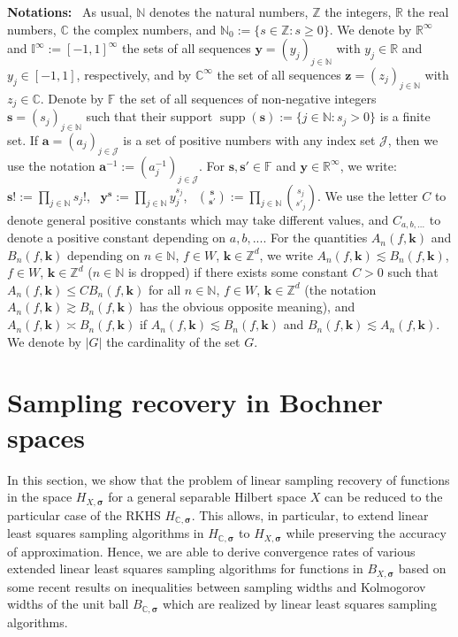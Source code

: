 \documentclass[11pt]{article}
\numberwithin{equation}{section}
\theoremstyle{definition}
\theoremstyle{remark}
\newcommand{\ba}{{\boldsymbol{a}}}
\newcommand{\bk}{{\boldsymbol{k}}}
\newcommand{\bs}{{\boldsymbol{s}}}
\newcommand{\by}{{\boldsymbol{y}}}
\newcommand{\bz}{{\boldsymbol{z}}}
\newcommand{\bsigma}{{\boldsymbol{\sigma}}}
\def\ZZd{{\mathbb Z}^d}
\def\ZZ{{\mathbb Z}}
\def\RR{{\mathbb R}}
\def\NN{{\mathbb N}}
\def\CC{{\mathbb C}}
\def\CC{{\mathbb C}}
\def\NN{{\mathbb N}}
\def\RR{{\mathbb R}}
\def\FF{{\mathcal F}}
\def\ZZd{{\mathbb Z}^d}
\def\IIi{{\mathbb I}^\infty}
\def\CCi{{\mathbb C}^\infty}
\def\RRi{{\mathbb R}^\infty}
\def\FF{{\mathcal F}}
\def\Jj{{\mathcal J}}
\def\CC{{\mathbb C}}
\def\ZZ{{\mathbb Z}}
\def\NN{{\mathbb N}}
\def\FF{{\mathbb F}}
\def\supp{\operatorname{supp}}
\begin{document}
\medskip
\noindent
{\bf Notations:} \ As usual, $\NN$ denotes the natural numbers, $\ZZ$ the integers, $\RR$ the real numbers, $\CC$ the complex numbers, and 
$ \NN_0:= \{s \in \ZZ: s \ge 0 \}$.
We denote by $\RR^\infty$ and $\IIi:=[-1,1]^\infty$ the
sets of all sequences $\by = (y_j)_{j\in \NN}$ with $y_j\in \RR$ and $y_j\in [-1,1]$, respectively, and by $\CCi$ the
set of all sequences $\bz = (z_j)_{j\in \NN}$ with $z_j\in \CC$.
 Denote by $\FF$ the set of all sequences of non-negative integers $\bs=(s_j)_{j \in \NN}$ such that their support $\supp (\bs):= \{j \in \NN: s_j >0\}$ is a finite set. 
If $\ba= (a_j)_{j \in \Jj}$ is a set of positive numbers with any index set $\Jj$, then we use the notation 
$\ba^{-1}:= (a_j^{-1})_{j \in \Jj}$.
For $\bs, \bs' \in \FF$ and $\by \in \RRi$, we write: 
$\bs!:= \prod_{j \in \NN}s_j!$, \ $\by^\bs:= \prod_{j \in \NN}y_j^{s_j}$, \
$\binom{\bs}{\bs'}:= \prod_{j \in \NN}\binom{s_j}{s'_j}$.
We use the letter $C$ to denote general 
positive constants which may take different values, and $C_{a,b,...}$ to denote a positive constant depending on $a,b,...$.
 For the quantities $A_n(f,\bk)$ and $B_n(f,\bk)$ depending on 
 $n \in \NN$, $f \in W$, $\bk \in \ZZd$, 
 we write $A_n(f,\bk) \lesssim B_n(f,\bk)$, $f \in W$, $\bk \in \ZZd$ ($n \in \NN$ is dropped)
 if there exists some constant $C >0$ such that 
 $A_n(f,\bk) \le CB_n(f,\bk)$ for all $n \in \NN$, $f \in W$, $\bk \in \ZZd$ (the notation $A_n(f,\bk) \gtrsim B_n(f,\bk)$ has the obvious opposite meaning), and 
 $A_n(f,\bk) \asymp B_n(f,\bk)$ if $A_n(f,\bk) \lesssim B_n(f,\bk)$
 and $B_n(f,\bk) \lesssim A_n(f,\bk)$. We denote by $|G|$ the cardinality of the set $G$. 
 
\section{Sampling recovery in Bochner spaces}
\label{Sampling recovery in Bochner spaces}	

In this section, we show that the problem of linear sampling recovery of functions in the space $H_{X,\bsigma}$ for a general separable Hilbert space $X$ can be reduced to the particular case of the RKHS	$H_{\CC,\bsigma}$. This allows, in particular, to extend linear least squares sampling algorithms in $H_{\CC,\bsigma}$ to $H_{X,\bsigma}$ while preserving the accuracy of approximation. Hence, we are able to derive convergence rates of various extended linear least squares sampling algorithms
for functions in $B_{X,\bsigma}$ based on some recent
 results on inequalities between sampling widths and Kolmogorov widths of the unit ball $B_{\CC,\bsigma}$ which are realized by linear least squares sampling algorithms.
	
\end{document}
